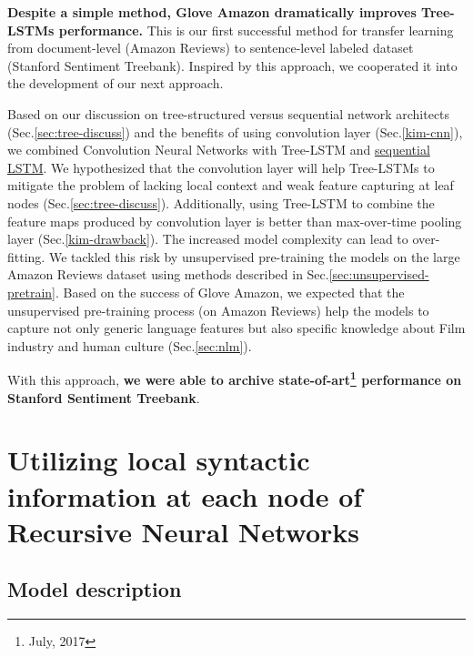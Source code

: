 \begin{description}
\textbf{Despite a simple method, Glove Amazon dramatically improves Tree- LSTMs performance. }
This is our first successful method for transfer learning from document-level (Amazon Reviews) to sentence-level labeled dataset (Stanford Sentiment Treebank).
Inspired by this approach, we cooperated it into the development of our next approach.

\item[\deschyperlink{sec:CNNtree}{Combining Recursive Neural Networks with Convolution Neural Networks}] \label{conv-tree-benefits} Based on our discussion on tree-structured versus sequential network architects (Sec.\ref{sec:tree-discuss}) and the benefits of using convolution layer (Sec.\ref{kim-cnn}), we combined Convolution Neural Networks with Tree-LSTM and \hyperref[sec:lstm]{sequential LSTM}.
We hypothesized that the convolution layer will help Tree-LSTMs to mitigate the problem of lacking local context and weak feature capturing at leaf nodes (Sec.\ref{sec:tree-discuss}).
Additionally, using Tree-LSTM to combine the feature maps produced by convolution layer is better than max-over-time pooling layer (Sec.\ref{kim-drawback}).
The increased model complexity can lead to over-fitting.
We tackled this risk by unsupervised pre-training the models on the large Amazon Reviews dataset using methods described in Sec.\ref{sec:unsupervised-pretrain}.
Based on the success of Glove Amazon, we expected that the unsupervised pre-training process (on Amazon Reviews) help the models to capture not only generic language features but also specific knowledge about Film industry and human culture (Sec.\ref{sec:nlm}).

With this approach, \textbf{we were able to archive state-of-art\footnote{July, 2017} performance on Stanford Sentiment Treebank}.
\end{description}


\hypertarget{sec:VTtree}{\section{Utilizing local  syntactic information at each node of Recursive Neural Networks}}\label{sec:VTtree}
\subsection{Model description}

